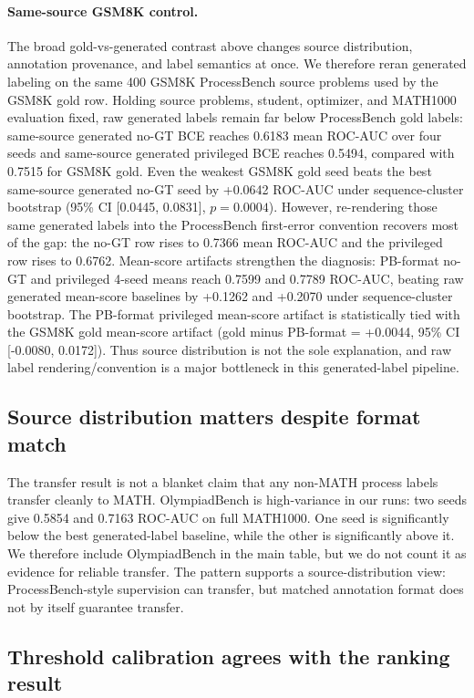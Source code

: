 \documentclass{article}
\begin{document}
\paragraph{Same-source GSM8K control.}
The broad gold-vs-generated contrast above changes source distribution, annotation provenance, and label semantics at once.
We therefore reran generated labeling on the same 400 GSM8K ProcessBench source problems used by the GSM8K gold row.
Holding source problems, student, optimizer, and MATH1000 evaluation fixed, raw generated labels remain far below ProcessBench gold labels: same-source generated no-GT BCE reaches 0.6183 mean ROC-AUC over four seeds and same-source generated privileged BCE reaches 0.5494, compared with 0.7515 for GSM8K gold.
Even the weakest GSM8K gold seed beats the best same-source generated no-GT seed by +0.0642 ROC-AUC under sequence-cluster bootstrap (95\% CI [0.0445, 0.0831], $p=0.0004$).
However, re-rendering those same generated labels into the ProcessBench first-error convention recovers most of the gap: the no-GT row rises to 0.7366 mean ROC-AUC and the privileged row rises to 0.6762.
Mean-score artifacts strengthen the diagnosis: PB-format no-GT and privileged 4-seed means reach 0.7599 and 0.7789 ROC-AUC, beating raw generated mean-score baselines by +0.1262 and +0.2070 under sequence-cluster bootstrap.
The PB-format privileged mean-score artifact is statistically tied with the GSM8K gold mean-score artifact (gold minus PB-format = +0.0044, 95\% CI [-0.0080, 0.0172]).
Thus source distribution is not the sole explanation, and raw label rendering/convention is a major bottleneck in this generated-label pipeline.

\subsection{Source distribution matters despite format match}

The transfer result is not a blanket claim that any non-MATH process labels transfer cleanly to MATH.
OlympiadBench is high-variance in our runs: two seeds give 0.5854 and 0.7163 ROC-AUC on full MATH1000.
One seed is significantly below the best generated-label baseline, while the other is significantly above it.
We therefore include OlympiadBench in the main table, but we do not count it as evidence for reliable transfer.
The pattern supports a source-distribution view: ProcessBench-style supervision can transfer, but matched annotation format does not by itself guarantee transfer.

\subsection{Threshold calibration agrees with the ranking result}
\end{document}
